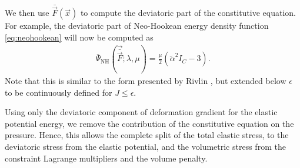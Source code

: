 We then use $\bar{\vec{F}}(\vec{x})$ to compute the deviatoric part of the constitutive equation. For example, 
the deviatoric part of Neo-Hookean energy density function \eqref{eq:neohookean} will now be computed as
\begin{align}
\bar{\Psi}_{\text{NH}}(\vec{\bar{\vec{F}}}; \lambda, \mu) = \frac{\mu}{2}(\tilde{\alpha}^2 I_C - 3).
\label{eq:deviatoric_neohookean}
\end{align}
Note that this is similar to the form presented by Rivlin , but extended below 
$\epsilon$ to be continuously defined for $J \leq \epsilon$. 

Using only the deviatoric component of deformation gradient for the elastic potential energy, we remove the contribution of the constitutive equation on the pressure. Hence, this allows the complete split of the total elastic stress, to the deviatoric stress from the elastic potential, and the volumetric stress from the constraint Lagrange multipliers and the volume penalty.